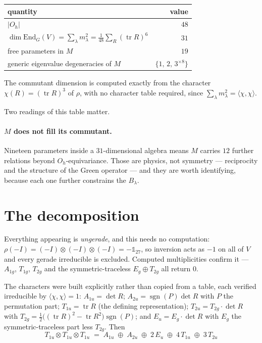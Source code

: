 \documentclass[11pt]{article}
\begin{document}
\begin{table}[h]
\centering
\begin{tabular}{lr}
\toprule
quantity & value \\
\midrule
$|O_h|$ & $48$ \\
$\dim\mathrm{End}_G(V)=\sum_\lambda m_\lambda^2
  =\frac{1}{48}\sum_{R}(\operatorname{tr}R)^6$ & $31$ \\
free parameters in $M$ & $19$ \\
generic eigenvalue degeneracies of $M$ & $\{1,\,2,\,3^{\times8}\}$ \\
\bottomrule
\end{tabular}
\end{table}

The commutant dimension is computed exactly from the character
$\chi(R)=(\operatorname{tr}R)^3$ of $\rho$, with no character table required,
since $\sum_\lambda m_\lambda^2 = \langle\chi,\chi\rangle$.

Two readings of this table matter.

\paragraph{$M$ does not fill its commutant.} Nineteen parameters inside a
$31$-dimensional algebra means $M$ carries $12$ further relations beyond
$O_h$-equivariance. Those are physics, not symmetry --- reciprocity and the
structure of the Green operator --- and they are worth identifying, because each
one further constrains the $B_\lambda$.

\section{The decomposition}

Everything appearing is \emph{ungerade}, and this needs no computation:
$\rho(-I)=(-I)\otimes(-I)\otimes(-I)=-\mathbb{1}_{27}$, so inversion acts as
$-1$ on all of $V$ and every gerade irreducible is excluded. Computed
multiplicities confirm it --- $A_{1g}$, $T_{1g}$, $T_{2g}$ and the
symmetric-traceless $E_g\oplus T_{2g}$ all return $0$.

The characters were built explicitly rather than copied from a table, each
verified irreducible by $\langle\chi,\chi\rangle=1$: $A_{1u}=\det R$;
$A_{2u}=\operatorname{sgn}(P)\det R$ with $P$ the permutation part;
$T_{1u}=\operatorname{tr}R$ (the defining representation);
$T_{2u}=T_{2g}\!\cdot\!\det R$ with
$T_{2g}=\tfrac12\bigl((\operatorname{tr}R)^2-\operatorname{tr}R^2\bigr)\operatorname{sgn}(P)$;
and $E_u=E_g\!\cdot\!\det R$ with $E_g$ the symmetric-traceless part less
$T_{2g}$. Then
\[
  \boxed{\;T_{1u}\otimes T_{1u}\otimes T_{1u}
   \;=\; A_{1u}\;\oplus\;A_{2u}\;\oplus\;2\,E_u\;\oplus\;4\,T_{1u}\;\oplus\;3\,T_{2u}\;}
\]
\end{document}
